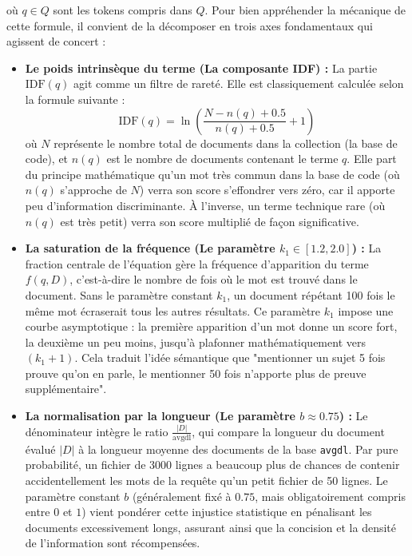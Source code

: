 où $q\in Q$ sont les tokens compris dans $Q$. Pour bien appréhender la mécanique de cette formule, il convient de la décomposer en trois axes fondamentaux qui agissent de concert : \\

\begin{itemize}
    \item \textbf{Le poids intrinsèque du terme (La composante IDF) :} 
    La partie $\text{IDF}(q)$ agit comme un filtre de rareté. Elle est classiquement calculée selon la formule suivante :
    $$\text{IDF}(q) = \ln\left(\frac{N - n(q) + 0.5}{n(q) + 0.5} + 1\right)$$
    où $N$ représente le nombre total de documents dans la collection (la base de code), et $n(q)$ est le nombre de documents contenant le terme $q$. 
    Elle part du principe mathématique qu'un mot très commun dans la base de code (où $n(q)$ s'approche de $N$) verra son score s'effondrer vers zéro, car il apporte peu d'information discriminante. À l'inverse, un terme technique rare (où $n(q)$ est très petit) verra son score multiplié de façon significative.\\
    
    \item \textbf{La saturation de la fréquence (Le paramètre $k_1 \in [1.2, 2.0]$) :} 
    La fraction centrale de l'équation gère la fréquence d'apparition du terme $f(q, D)$, c'est-à-dire le nombre de fois où le mot est trouvé dans le document. Sans le paramètre constant $k_1$, un document répétant 100 fois le même mot écraserait tous les autres résultats. Ce paramètre $k_1$ impose une courbe asymptotique : la première apparition d'un mot donne un score fort, la deuxième un peu moins, jusqu'à plafonner mathématiquement vers $(k_1 + 1)$. Cela traduit l'idée sémantique que "mentionner un sujet 5 fois prouve qu'on en parle, le mentionner 50 fois n'apporte plus de preuve supplémentaire".\\

    \item \textbf{La normalisation par la longueur (Le paramètre $b \approx 0.75$) :} 
    Le dénominateur intègre le ratio $\frac{|D|}{\text{avgdl}}$, qui compare la longueur du document évalué $|D|$ à la longueur moyenne des documents de la base \texttt{avgdl}. Par pure probabilité, un fichier de 3000 lignes a beaucoup plus de chances de contenir accidentellement les mots de la requête qu'un petit fichier de 50 lignes. Le paramètre constant $b$ (généralement fixé à $0.75$, mais obligatoirement compris entre $0$ et $1$) vient pondérer cette injustice statistique en pénalisant les documents excessivement longs, assurant ainsi que la concision et la densité de l'information sont récompensées.\\
\end{itemize}

